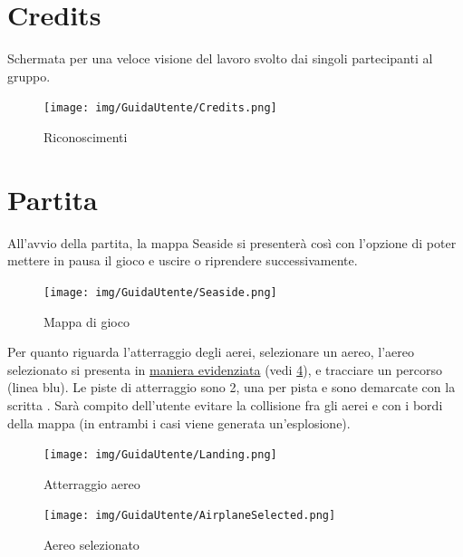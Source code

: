 \documentclass[a4paper,12pt]{report}
\begin{document}
\clearpage

\section*{Credits}
Schermata per una veloce visione del lavoro svolto dai singoli partecipanti al gruppo.
\begin{figure}[H]
    \begin{center}
        \centering
        \texttt{[image: img/GuidaUtente/Credits.png]}
    \end{center}
    \caption{Riconoscimenti}
    \label{img:credits}
\end{figure}

\clearpage

\section*{Partita}
All'avvio della partita, la mappa Seaside si presenterà così con l'opzione di poter mettere in pausa il gioco e uscire o riprendere successivamente.
\begin{figure}[H]
    \begin{center}
        \centering
        \texttt{[image: img/GuidaUtente/Seaside.png]}
    \end{center}
    \caption{Mappa di gioco}
    \label{img:seaside}
\end{figure}

\clearpage

\noindent Per quanto riguarda l'atterraggio degli aerei, selezionare un aereo, l'aereo selezionato si presenta in \underline{maniera evidenziata} (vedi \figurename{ \ref{img:airplane}}), e tracciare un percorso (linea blu). Le piste di atterraggio sono 2, una per pista e sono demarcate con la scritta . Sarà compito dell'utente evitare la collisione fra gli aerei e con i bordi della mappa (in entrambi i casi viene generata un'esplosione).
\begin{figure}[H]
    \begin{center}
        \centering
        \texttt{[image: img/GuidaUtente/Landing.png]}
    \end{center}
    \caption{Atterraggio aereo}
    \label{img:landing}
\end{figure}

\begin{figure}[H]
    \begin{center}
        \centering
        \texttt{[image: img/GuidaUtente/AirplaneSelected.png]}
    \end{center}
    \caption{Aereo selezionato}
    \label{img:airplane}
\end{figure}
\end{document}
